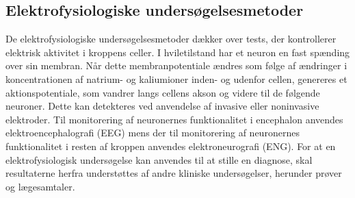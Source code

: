 \subsection{Elektrofysiologiske undersøgelsesmetoder}
De elektrofysiologiske undersøgelsesmetoder dækker over tests, der kontrollerer elektrisk aktivitet i kroppens celler. I hviletilstand har et neuron en fast spænding over sin membran. Når dette membranpotentiale ændres som følge af ændringer i koncentrationen af natrium- og kaliumioner inden- og udenfor cellen, genereres et aktionspotentiale, som vandrer langs cellens akson og videre til de følgende neuroner. Dette kan detekteres ved anvendelse af invasive eller noninvasive elektroder. Til monitorering af neuronernes funktionalitet i encephalon anvendes elektroencephalografi (EEG) mens der til monitorering af neuronernes funktionalitet i resten af kroppen anvendes elektroneurografi (ENG). For at en elektrofysiologisk undersøgelse kan anvendes til at stille en diagnose, skal resultaterne herfra understøttes af andre kliniske undersøgelser, herunder prøver og lægesamtaler. \citep{Robinson2008}


